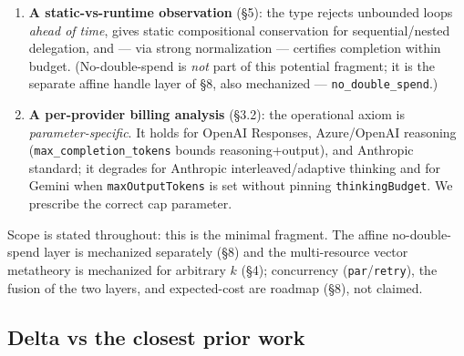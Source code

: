 \documentclass[11pt]{article}
\theoremstyle{plain}
\begin{document}
\begin{enumerate}
{  machine-checked instantiation to the agent-workflow/per-call-cap setting and (ii) the billing
  analysis below}. Khan establishes the aggregate bound via Proposition~1 + empirics, unmechanized.
\item \textbf{A static-vs-runtime observation} (\S5): the type rejects unbounded loops \emph{ahead
  of time}, gives static compositional conservation for sequential/nested delegation, and --- via
  strong normalization --- certifies completion within budget. (No-double-spend is \emph{not} part
  of this potential fragment; it is the separate affine handle layer of \S8, also mechanized ---
  \texttt{no\_double\_spend}.)
\item \textbf{A per-provider billing analysis} (\S3.2): the operational axiom is
  \emph{parameter-specific}. It holds for OpenAI Responses, Azure/OpenAI reasoning
  (\texttt{max\_completion\_tokens} bounds reasoning+output), and Anthropic standard; it degrades
  for Anthropic interleaved/adaptive thinking and for Gemini when \texttt{maxOutputTokens} is set
  without pinning \texttt{thinkingBudget}. We prescribe the correct cap parameter.
\end{enumerate}

Scope is stated throughout: this is the minimal fragment. The affine no-double-spend layer is
mechanized separately (\S8) and the multi-resource vector metatheory is mechanized for arbitrary
$k$ (\S4); concurrency (\texttt{par}/\texttt{retry}), the fusion of the two layers, and
expected-cost are roadmap (\S8), not claimed.

\subsection{Delta vs the closest prior work}
\end{document}
